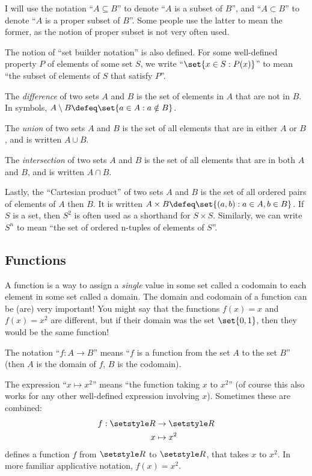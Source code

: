 I will use the notation ``\(A \subseteq B\)'' to denote ``\(A\) is a subset
of \(B\)'', and ``\(A \subset B\)'' to denote ``\(A\) is a proper subset of
\(B\)''. Some people use the latter to mean the former, as the notion of proper
subset is not very often used.

The notion of ``set builder notation'' is also defined. For some well-defined
property \(P\) of elements of some set \(S\), we write
``\(\set{x \in S: P(x)}\)'' to mean ``the subset of elements of \(S\) that
satisfy \(P\)''.

The \emph{difference} of two sets \(A\) and \(B\) is the set of elements in
\(A\) that are not in \(B\). In symbols,
\(A \setminus B \defeq \set{a \in A : a \notin B}\).

The \emph{union} of two sets \(A\) and \(B\) is the set of all elements that are
in either \(A\) or \(B\), and is written \(A \cup B\).

The \emph{intersection} of two sets \(A\) and \(B\) is the set of all elements
that are in both \(A\) and \(B\), and is written \(A \cap B\).

Lastly, the ``Cartesian product'' of two sets \(A\) and \(B\) is the set of all
ordered pairs of elements of \(A\) then \(B\). It is written
\(A \times B \defeq \set{(a, b) : a \in A, b \in B}\). If \(S\) is a set, then
\(S^2\) is often used as a shorthand for \(S \times S\). Similarly, we can write
\(S^n\) to mean ``the set of ordered n-tuples of elements of \(S\)''.

\subsection*{Functions}

A function is a way to assign a \emph{single} value in some set called a
codomain to each element in some set called a domain. The domain and codomain of
a function can be (are) very important! You might say that the functions \(f(x)
= x\) and \(f(x) = x^2\) are different, but if their domain was the set
\(\set{0, 1}\), then they would be the same function!

The notation ``\(f: A \to B\)'' means ``\(f\) is a function from the set \(A\)
to the set \(B\)'' (then \(A\) is the domain of \(f\), \(B\) is the codomain).

The expression ``\(x \mapsto x^2\)'' means ``the function taking \(x\) to
\(x^2\)'' (of course this also works for any other well-defined expression
involving \(x\)). Sometimes these are combined:
\begin{align*}
 f: \Reals &\to \Reals \\
    x &\mapsto x^2
\end{align*}
defines a function \(f\) from \(\Reals\) to \(\Reals\), that takes \(x\) to
\(x^2\). In more familiar applicative notation, \(f(x) = x^2\).

